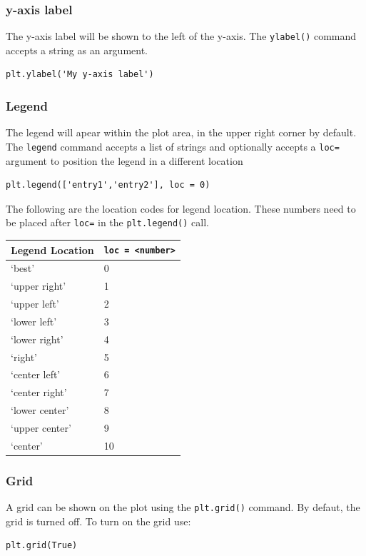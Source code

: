 \documentclass{book}
\begin{document}
    \subsubsection{y-axis label}\label{y-axis-label}

The y-axis label will be shown to the left of the y-axis. The
\lstinline!ylabel()! command accepts a string as an argument.

\begin{lstlisting}
plt.ylabel('My y-axis label')
\end{lstlisting}

    \subsubsection{Legend}\label{legend}

The legend will apear within the plot area, in the upper right corner by
default. The \lstinline!legend! command accepts a list of strings and
optionally accepts a \lstinline!loc=! argument to position the legend in
a different location

\begin{lstlisting}
plt.legend(['entry1','entry2'], loc = 0)
\end{lstlisting}

The following are the location codes for legend location. These numbers
need to be placed after \lstinline!loc=! in the \lstinline!plt.legend()!
call.

\begin{longtable}[]{@{}ll@{}}
\toprule
Legend Location & \lstinline!loc = <number>!\tabularnewline
\midrule
\endhead
`best' & 0\tabularnewline
`upper right' & 1\tabularnewline
`upper left' & 2\tabularnewline
`lower left' & 3\tabularnewline
`lower right' & 4\tabularnewline
`right' & 5\tabularnewline
`center left' & 6\tabularnewline
`center right' & 7\tabularnewline
`lower center' & 8\tabularnewline
`upper center' & 9\tabularnewline
`center' & 10\tabularnewline
\bottomrule
\end{longtable}

    \subsubsection{Grid}\label{grid}

A grid can be shown on the plot using the \lstinline!plt.grid()!
command. By defaut, the grid is turned off. To turn on the grid use:

\begin{lstlisting}
plt.grid(True)
\end{lstlisting}
\end{document}
